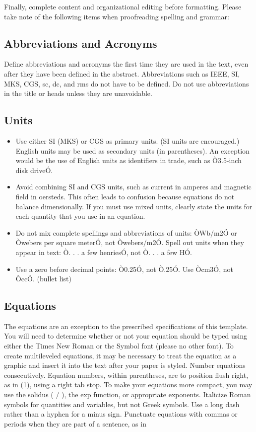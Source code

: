 \documentclass[letterpaper, 10 pt, conference]{ieeeconf}  %
\begin{document}
Finally, complete content and organizational editing before formatting. Please take note of the following items when proofreading spelling and grammar:

\subsection{Abbreviations and Acronyms} Define abbreviations and acronyms the first time they are used in the text, even after they have been defined in the abstract. Abbreviations such as IEEE, SI, MKS, CGS, sc, dc, and rms do not have to be defined. Do not use abbreviations in the title or heads unless they are unavoidable.

\subsection{Units}

\begin{itemize}

\item Use either SI (MKS) or CGS as primary units. (SI units are encouraged.) English units may be used as secondary units (in parentheses). An exception would be the use of English units as identifiers in trade, such as Ò3.5-inch disk driveÓ.
\item Avoid combining SI and CGS units, such as current in amperes and magnetic field in oersteds. This often leads to confusion because equations do not balance dimensionally. If you must use mixed units, clearly state the units for each quantity that you use in an equation.
\item Do not mix complete spellings and abbreviations of units: ÒWb/m2Ó or Òwebers per square meterÓ, not Òwebers/m2Ó.  Spell out units when they appear in text: Ò. . . a few henriesÓ, not Ò. . . a few HÓ.
\item Use a zero before decimal points: Ò0.25Ó, not Ò.25Ó. Use Òcm3Ó, not ÒccÓ. (bullet list)

\end{itemize}


\subsection{Equations}

The equations are an exception to the prescribed specifications of this template. You will need to determine whether or not your equation should be typed using either the Times New Roman or the Symbol font (please no other font). To create multileveled equations, it may be necessary to treat the equation as a graphic and insert it into the text after your paper is styled. Number equations consecutively. Equation numbers, within parentheses, are to position flush right, as in (1), using a right tab stop. To make your equations more compact, you may use the solidus ( / ), the exp function, or appropriate exponents. Italicize Roman symbols for quantities and variables, but not Greek symbols. Use a long dash rather than a hyphen for a minus sign. Punctuate equations with commas or periods when they are part of a sentence, as in
\end{document}
